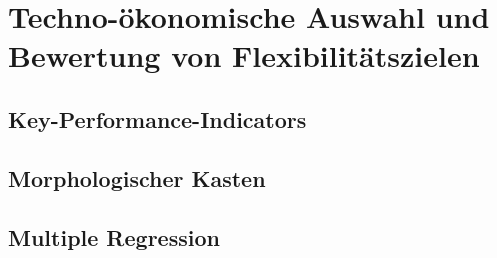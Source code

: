 \section{Techno-ökonomische Auswahl und Bewertung von Flexibilitätszielen}
\label{ch_05Techno-ökonomische Auswahl und Bewertung von Flexibilitätszielen}

\subsection{Key-Performance-Indicators}
\label{ch_05Key-Performance-Indicators}

\subsection{Morphologischer Kasten}
\label{ch_05Morphologischer Kasten}

\subsection{Multiple Regression}
\label{ch_05Multiple Regression}
